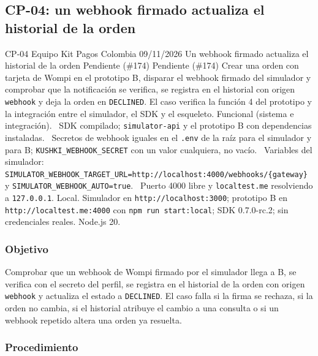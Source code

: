 \subsection{CP-04: un webhook firmado actualiza el historial de la orden}
\label{anexo:cp04}

\FichaCaso
  {CP-04}
  {Equipo Kit Pagos Colombia}
  {09/11/2026}
  {Un webhook firmado actualiza el historial de la orden}
  {Pendiente (\#174)}
  {Pendiente (\#174)}
  {Crear una orden con tarjeta de Wompi en el prototipo B, disparar el webhook firmado del simulador y comprobar que la notificación se verifica, se registra en el historial con origen \texttt{webhook} y deja la orden en \texttt{DECLINED}. El caso verifica la función 4 del prototipo y la integración entre el simulador, el SDK y el esqueleto.}
  {Funcional (sistema e integración).}
  {\textbullet\ SDK compilado; \texttt{simulator-api} y el prototipo B con dependencias instaladas.\newline
   \textbullet\ Secretos de webhook iguales en el \texttt{.env} de la raíz para el simulador y para B; \texttt{KUSHKI\_WEBHOOK\_SECRET} con un valor cualquiera, no vacío.\newline
   \textbullet\ Variables del simulador: \texttt{SIMULATOR\_WEBHOOK\_TARGET\_URL=http://localhost:4000/webhooks/\{gateway\}} y \texttt{SIMULATOR\_WEBHOOK\_AUTO=true}.\newline
   \textbullet\ Puerto 4000 libre y \texttt{localtest.me} resolviendo a \texttt{127.0.0.1}.}
  {Local. Simulador en \texttt{http://localhost:3000}; prototipo B en \texttt{http://localtest.me:4000} con \texttt{npm run start:local}; SDK 0.7.0-rc.2; sin credenciales reales. Node.js 20.}

\subsubsection{Objetivo}

Comprobar que un webhook de Wompi firmado por el simulador llega a B, se verifica con el secreto del perfil, se registra en el historial de la orden con origen \texttt{webhook} y actualiza el estado a \texttt{DECLINED}. El caso falla si la firma se rechaza, si la orden no cambia, si el historial atribuye el cambio a una consulta o si un webhook repetido altera una orden ya resuelta.

\subsubsection{Procedimiento}


